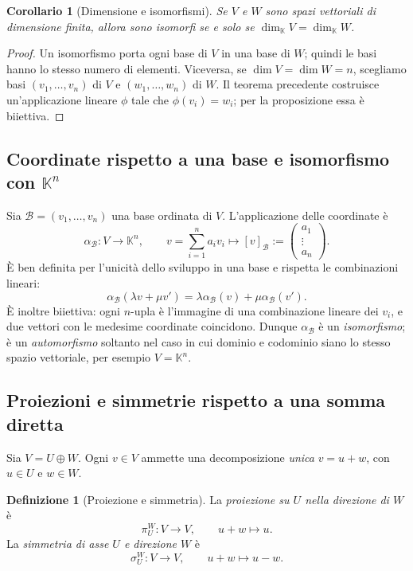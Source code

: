 \documentclass[11pt,a4paper]{article}
\newcommand{\KK}{\mathbb{K}}
\theoremstyle{plain}
\newtheorem{cor}[prop]{Corollario}
\theoremstyle{definition}
\newtheorem{defn}[prop]{Definizione}
\theoremstyle{remark}
\begin{document}
\begin{cor}[Dimensione e isomorfismi]
Se $V$ e $W$ sono spazi vettoriali di dimensione finita, allora
sono isomorfi se e solo se $\dim_{\KK}V=\dim_{\KK}W$.
\end{cor}
\begin{proof}
Un isomorfismo porta ogni base di $V$ in una base di $W$;
quindi le basi hanno lo stesso numero di elementi.
Viceversa, se $\dim V=\dim W=n$, scegliamo basi
$(v_1,\ldots,v_n)$ di $V$ e $(w_1,\ldots,w_n)$ di $W$.
Il teorema precedente costruisce un'applicazione lineare
$\phi$ tale che $\phi(v_i)=w_i$; per la proposizione essa è biiettiva.
\end{proof}

\subsection{Coordinate rispetto a una base e isomorfismo con $\KK^n$}

Sia $\mathcal B=(v_1,\ldots,v_n)$ una base ordinata di $V$.
L'applicazione delle coordinate è
\[
 \alpha_{\mathcal B}:V\longrightarrow\KK^n,\qquad
 v=\sum_{i=1}^n a_i v_i\longmapsto
 [v]_{\mathcal B}:=\begin{pmatrix}a_1\\\vdots\\a_n\end{pmatrix}.
\]
È ben definita per l'unicità dello sviluppo in una base e rispetta
le combinazioni lineari:
\[
 \alpha_{\mathcal B}(\lambda v+\mu v')
 =\lambda\alpha_{\mathcal B}(v)+\mu\alpha_{\mathcal B}(v').
\]
È inoltre biiettiva: ogni $n$-upla è l'immagine di una combinazione
lineare dei $v_i$, e due vettori con le medesime coordinate coincidono.
Dunque $\alpha_{\mathcal B}$ è un \emph{isomorfismo}; è un
\emph{automorfismo} soltanto nel caso in cui dominio e codominio
siano lo stesso spazio vettoriale, per esempio $V=\KK^n$.

\subsection{Proiezioni e simmetrie rispetto a una somma diretta}

Sia $V=U\oplus W$. Ogni $v\in V$ ammette una decomposizione
\emph{unica} $v=u+w$, con $u\in U$ e $w\in W$.

\begin{defn}[Proiezione e simmetria]
La \emph{proiezione su $U$ nella direzione di $W$} è
\[
 \pi_U^W:V\longrightarrow V,\qquad u+w\longmapsto u.
\]
La \emph{simmetria di asse $U$ e direzione $W$} è
\[
 \sigma_U^W:V\longrightarrow V,\qquad u+w\longmapsto u-w.
\]
\end{defn}
\end{document}
